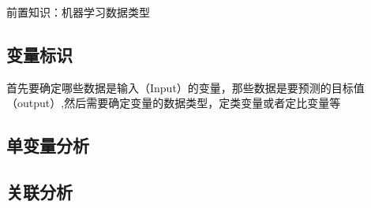 前置知识：机器学习数据类型
\subsection{变量标识}
首先要确定哪些数据是输入（Input）的变量，那些数据是要预测的目标值（output）,然后需要确定变量的数据类型，定类变量或者定比变量等
\subsection{单变量分析}

\subsection{关联分析}
